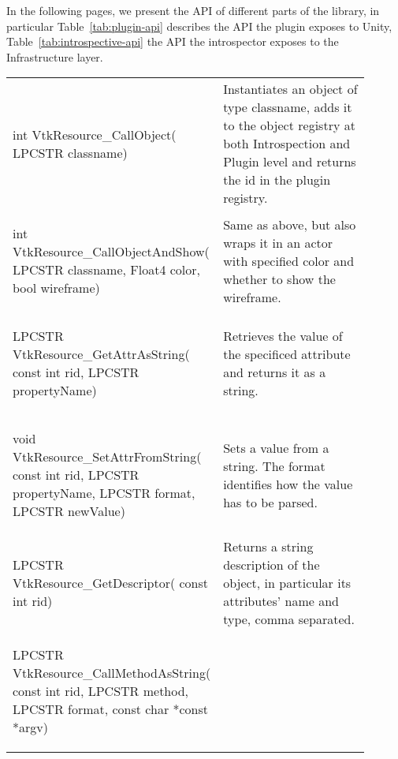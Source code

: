 \begin{appendices}
In the following pages, we present the API of different parts of the library, in particular Table~\ref{tab:plugin-api} describes the API the plugin exposes to Unity, Table~\ref{tab:introspective-api} the API the introspector exposes to the Infrastructure layer.

\begin{landscape}
	\begin{longtable}[c]{
			>{\raggedright\arraybackslash}p{0.4\linewidth}
			>{\raggedright\arraybackslash}p{0.5\linewidth}
		}
		\multicolumn{1}{c}{\textbf{Function signature}} &
		\multicolumn{1}{c}{\textbf{Explenation}} 
		\\ \hline
	\endhead
	\begin{codify}
	int VtkResource_CallObject(
		LPCSTR classname)
	\end{codify} &
	Instantiates an object of type classname, adds it to the object registry at both Introspection and Plugin level and returns the id in the plugin registry.
	\\
	\begin{codify}
	int VtkResource_CallObjectAndShow(
		LPCSTR classname,
		Float4 color,
		bool wireframe)
	\end{codify} &
	Same as above, but also wraps it in an actor with specified color and whether to show the wireframe.
	\\
	\begin{codify}
	LPCSTR VtkResource_GetAttrAsString(
		const int rid,
		LPCSTR propertyName)
	\end{codify} &
	Retrieves the value of the specificed attribute and returns it as a string.
	\\
	\begin{codify}
	void VtkResource_SetAttrFromString(
		const int rid,
		LPCSTR propertyName,
		LPCSTR format,
		LPCSTR newValue)
	\end{codify} &
	Sets a value from a string. The format identifies how the value has to be parsed.
	\\
	\begin{codify}
	LPCSTR VtkResource_GetDescriptor(
		const int rid)
	\end{codify} &
	Returns a string description of the object, in particular its attributes' name and type, comma separated.
	\\
	\begin{codify}
	LPCSTR VtkResource_CallMethodAsString(
		const int rid,
		LPCSTR method,
		LPCSTR format,
		const char *const *argv)
	\end{codify} &

\end{longtable}
\end{landscape}
\end{appendices}
